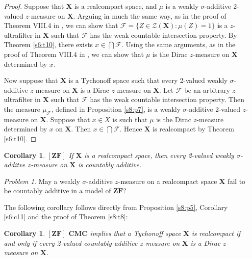 \documentclass[12pt,twoside,leqno]{article}
\theoremstyle{plain}
\newtheorem{corollary}[theorem]{Corollary}
\theoremstyle{definition}
\theoremstyle{remark}
\newtheorem{problem}[theorem]{Problem}
\begin{document}
\begin{proof}
	Suppose that $\mathbf{X}$ is a realcompact space, and $\mu$ is a weakly $\sigma$-additive 2-valued $z$-measure on $\mathbf{X}$. Arguing in much the same way, as in the proof of Theorem VIII.4 in \cite{nag}, we can show that $\mathcal{F}=\{ Z\in\mathcal{Z}(\mathbf{X}): \mu(Z)=1\}$ is a $z$-ultrafilter in $\mathbf{X}$ such that $\mathcal{F}$ has the weak countable intersection property. By Theorem \ref{s6:t10}, there exists $x\in\bigcap\mathcal{F}$. Using the same arguments, as in the proof of Theorem VIII.4 in \cite{nag}, we can show that $\mu$ is the Dirac $z$-measure on $\mathbf{X}$ determined by $x$.
	
	Now suppose that $\mathbf{X}$ is a Tychonoff space such that every 2-valued weakly $\sigma$-additive $z$-measure on $\mathbf{X}$ is a Dirac $z$-measure on $\mathbf{X}$. Let $\mathcal{F}$ be an arbitrary $z$-ultrafilter in $\mathbf{X}$ such that $\mathcal{F}$ has the weak countable intersection property. Then the measure $\mu_{\mathcal{F}}$, defined in Proposition \ref{s8:p7}, is a weakly $\sigma$-additive 2-valued $z$-measure on $\mathbf{X}$. Suppose that $x\in X$ is such that $\mu$ is the Dirac $z$-measure determined by $x$ on $\mathbf{X}$. Then $x\in\bigcap\mathcal{F}$. Hence $\mathbf{X}$ is realcompact by Theorem \ref{s6:t10}.
\end{proof}

\begin{corollary}
	\label{s8:c9}
	$[\mathbf{ZF}]$ If $\mathbf{X}$ is a realcompact space, then every 2-valued weakly $\sigma$-additve $z$-measure on $\mathbf{X}$ is countably additive.
\end{corollary}

\begin{problem}
	\label{s8:q10}
	May a weakly $\sigma$-additive $z$-measure on a realcompact space $\mathbf{X}$ fail to be countably additive in a model of $\mathbf{ZF}$?
\end{problem}

The following corollary follows directly from  Proposition \ref{s8:p5}, Corollary \ref{s6:c11} and the proof of Theorem \ref{s8:t8}:

\begin{corollary}
	\label{s8:c11}
	$[\mathbf{ZF}]$ $\mathbf{CMC}$ implies that a Tychonoff space $\mathbf{X}$ is realcompact if and only if every 2-valued countably additive $z$-measure on $\mathbf{X}$ is a Dirac $z$-measure on $\mathbf{X}$.
\end{corollary}
\end{document}
